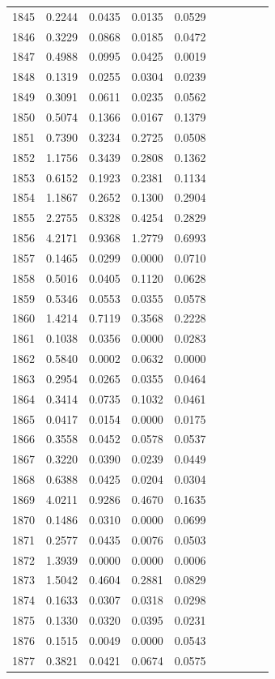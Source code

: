 \begin{table}
\begin{tabular}{cccccccccc}
1845& 0.2244& 0.0435& 0.0135& 0.0529\\ 
1846& 0.3229& 0.0868& 0.0185& 0.0472\\ 
1847& 0.4988& 0.0995& 0.0425& 0.0019\\ 
1848& 0.1319& 0.0255& 0.0304& 0.0239\\ 
1849& 0.3091& 0.0611& 0.0235& 0.0562\\ 
1850& 0.5074& 0.1366& 0.0167& 0.1379\\ 
1851& 0.7390& 0.3234& 0.2725& 0.0508\\ 
1852& 1.1756& 0.3439& 0.2808& 0.1362\\ 
1853& 0.6152& 0.1923& 0.2381& 0.1134\\ 
1854& 1.1867& 0.2652& 0.1300& 0.2904\\ 
1855& 2.2755& 0.8328& 0.4254& 0.2829\\ 
1856& 4.2171& 0.9368& 1.2779& 0.6993\\ 
1857& 0.1465& 0.0299& 0.0000& 0.0710\\ 
1858& 0.5016& 0.0405& 0.1120& 0.0628\\ 
1859& 0.5346& 0.0553& 0.0355& 0.0578\\ 
1860& 1.4214& 0.7119& 0.3568& 0.2228\\ 
1861& 0.1038& 0.0356& 0.0000& 0.0283\\ 
1862& 0.5840& 0.0002& 0.0632& 0.0000\\ 
1863& 0.2954& 0.0265& 0.0355& 0.0464\\ 
1864& 0.3414& 0.0735& 0.1032& 0.0461\\ 
1865& 0.0417& 0.0154& 0.0000& 0.0175\\ 
1866& 0.3558& 0.0452& 0.0578& 0.0537\\ 
1867& 0.3220& 0.0390& 0.0239& 0.0449\\ 
1868& 0.6388& 0.0425& 0.0204& 0.0304\\ 
1869& 4.0211& 0.9286& 0.4670& 0.1635\\ 
1870& 0.1486& 0.0310& 0.0000& 0.0699\\ 
1871& 0.2577& 0.0435& 0.0076& 0.0503\\ 
1872& 1.3939& 0.0000& 0.0000& 0.0006\\ 
1873& 1.5042& 0.4604& 0.2881& 0.0829\\ 
1874& 0.1633& 0.0307& 0.0318& 0.0298\\ 
1875& 0.1330& 0.0320& 0.0395& 0.0231\\ 
1876& 0.1515& 0.0049& 0.0000& 0.0543\\ 
1877& 0.3821& 0.0421& 0.0674& 0.0575\\ 

\end{tabular}
\end{table}
